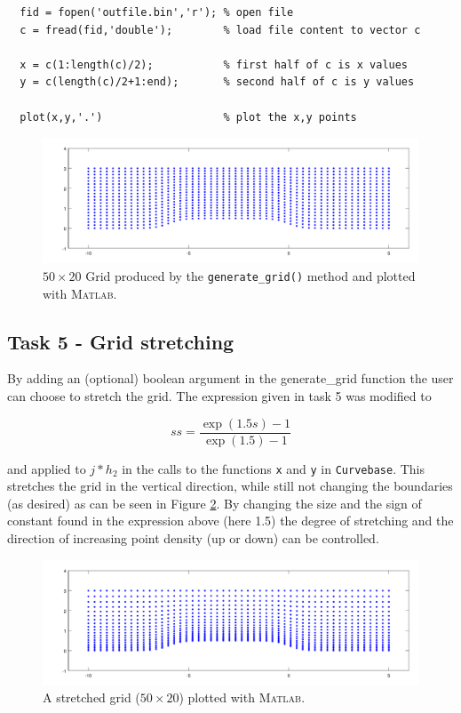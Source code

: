\documentclass[paper=a4, fontsize=12pt]{article} %
\begin{document}
\begin{lstlisting}
  fid = fopen('outfile.bin','r'); % open file
  c = fread(fid,'double');        % load file content to vector c

  x = c(1:length(c)/2);           % first half of c is x values
  y = c(length(c)/2+1:end);       % second half of c is y values

  plot(x,y,'.')                   % plot the x,y points

\end{lstlisting}
\begin{figure}[H]
  \centering
  \includegraphics[width=\textwidth]{task4.pdf}
  \caption{\small $50\times 20$ Grid produced by the \texttt{generate\_grid()} method and plotted with \textsc{Matlab.}\label{fig:grid}}
\end{figure}

\subsection*{Task 5 - Grid stretching}


By adding an (optional) boolean argument in the generate\_grid function the user can choose to stretch the grid. The expression given in task 5 was modified to

$$ ss = \frac{\exp(1.5s)-1}{\exp(1.5)-1}$$

and applied to $j*h_2$ in the calls to the functions \texttt{x} and \texttt{y} in \texttt{Curvebase}. This stretches the grid in the vertical direction, while still not changing the boundaries (as desired) as can be seen in Figure \ref{fig:stretched}. By changing the size and the sign of constant found in the expression above (here 1.5) the degree of stretching and the direction of increasing point density (up or down) can be controlled.   

\begin{figure}[H]
  \centering
  \includegraphics[width=\textwidth]{task5.pdf}
  \caption{\small A stretched grid ($50\times 20$) plotted with \textsc{Matlab.}\label{fig:stretched}}
\end{figure}
\end{document}
